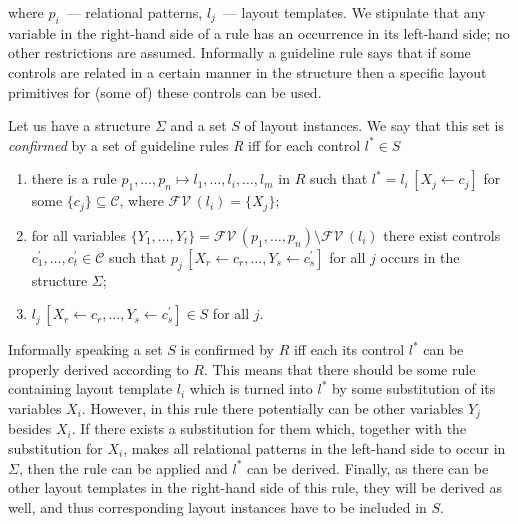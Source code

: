 \noindent  where $p_i$~--- relational patterns, $l_j$~--- layout templates. We stipulate that any variable in the right-hand side of a
rule has an occurrence in its left-hand side; no other restrictions are assumed. Informally a guideline rule says that if
some controls are related in a certain manner in the structure then a specific layout primitives for (some of) these
controls can be used.





Let us have a structure $\Sigma$ and a set $S$ of layout instances. We say that this set is \emph{confirmed} by a set of
guideline rules \emph{R} iff for each control $l^*\in S$

\begin{enumerate}
\item there is a rule $p_1,\dots,p_n\mapsto l_1,\dots,l_i,\dots, l_m$ in $R$
  such that $l^*=l_i\,[X_j\gets c_j]$  for
  some $\{c_j\}\subseteq\mathcal{C}$, where $\mathcal{FV}\,(l_i)=\{X_j\}$;

\item for all variables $\{Y_1,\dots,Y_t\}=\mathcal{FV}\,(p_1,\dots,p_n)\setminus\mathcal{FV}\,(l_i)$ there exist
  controls $c^\prime_1,\dots,c^\prime_t\in\mathcal{C}$ such that \mbox{$p_j\,[X_r\gets c_r,\dots,Y_s\gets c^\prime_s]$}
  for all $j$ occurs in the structure $\Sigma$;

\item \mbox{$l_j\,[X_r\gets c_r,\dots,Y_s\gets c^\prime_s]\in S$} for all $j$.

\end{enumerate}

Informally speaking a set $S$ is confirmed by $R$ iff each its control $l^*$ can be properly
derived according to $R$. This means that there should be some rule containing
layout template $l_i$ which is turned into $l^*$ by some substitution of its
variables $X_i$. However, in this rule there potentially can be other variables $Y_j$ besides $X_i$.
If there exists a substitution for them which, together with the substitution for $X_i$, makes all
relational patterns in the left-hand side to occur in $\Sigma$, then the rule can be
applied and $l^*$ can be derived. Finally, as there can be other layout templates in the
right-hand side of this rule, they will be derived as well, and thus corresponding
layout instances have to be included in $S$.

